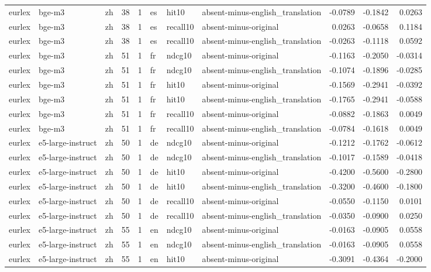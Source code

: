 \begin{tabular}{lllrrlllrrr}
eurlex & bge-m3 & zh & 38 & 1 & es & hit10 & absent-minus-english\_translation & -0.0789 & -0.1842 & 0.0263 \\
eurlex & bge-m3 & zh & 38 & 1 & es & recall10 & absent-minus-original & 0.0263 & -0.0658 & 0.1184 \\
eurlex & bge-m3 & zh & 38 & 1 & es & recall10 & absent-minus-english\_translation & -0.0263 & -0.1118 & 0.0592 \\
eurlex & bge-m3 & zh & 51 & 1 & fr & ndcg10 & absent-minus-original & -0.1163 & -0.2050 & -0.0314 \\
eurlex & bge-m3 & zh & 51 & 1 & fr & ndcg10 & absent-minus-english\_translation & -0.1074 & -0.1896 & -0.0285 \\
eurlex & bge-m3 & zh & 51 & 1 & fr & hit10 & absent-minus-original & -0.1569 & -0.2941 & -0.0392 \\
eurlex & bge-m3 & zh & 51 & 1 & fr & hit10 & absent-minus-english\_translation & -0.1765 & -0.2941 & -0.0588 \\
eurlex & bge-m3 & zh & 51 & 1 & fr & recall10 & absent-minus-original & -0.0882 & -0.1863 & 0.0049 \\
eurlex & bge-m3 & zh & 51 & 1 & fr & recall10 & absent-minus-english\_translation & -0.0784 & -0.1618 & 0.0049 \\
eurlex & e5-large-instruct & zh & 50 & 1 & de & ndcg10 & absent-minus-original & -0.1212 & -0.1762 & -0.0612 \\
eurlex & e5-large-instruct & zh & 50 & 1 & de & ndcg10 & absent-minus-english\_translation & -0.1017 & -0.1589 & -0.0418 \\
eurlex & e5-large-instruct & zh & 50 & 1 & de & hit10 & absent-minus-original & -0.4200 & -0.5600 & -0.2800 \\
eurlex & e5-large-instruct & zh & 50 & 1 & de & hit10 & absent-minus-english\_translation & -0.3200 & -0.4600 & -0.1800 \\
eurlex & e5-large-instruct & zh & 50 & 1 & de & recall10 & absent-minus-original & -0.0550 & -0.1150 & 0.0101 \\
eurlex & e5-large-instruct & zh & 50 & 1 & de & recall10 & absent-minus-english\_translation & -0.0350 & -0.0900 & 0.0250 \\
eurlex & e5-large-instruct & zh & 55 & 1 & en & ndcg10 & absent-minus-original & -0.0163 & -0.0905 & 0.0558 \\
eurlex & e5-large-instruct & zh & 55 & 1 & en & ndcg10 & absent-minus-english\_translation & -0.0163 & -0.0905 & 0.0558 \\
eurlex & e5-large-instruct & zh & 55 & 1 & en & hit10 & absent-minus-original & -0.3091 & -0.4364 & -0.2000 \\

\end{tabular}
